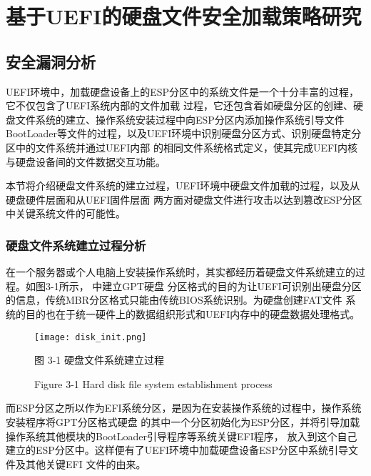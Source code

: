 %
%
\chapter{基于UEFI的硬盘文件安全加载策略研究}
\label{cha:architecture}

%
%
\section{安全漏洞分析}
UEFI环境中，加载硬盘设备上的ESP分区中的系统文件是一个十分丰富的过程，它不仅包含了UEFI系统内部的文件加载
过程，它还包含着如硬盘分区的创建、硬盘文件系统的建立、操作系统安装过程中向ESP分区内添加操作系统引导文件
BootLoader等文件的过程，以及UEFI环境中识别硬盘分区方式、识别硬盘特定分区中的文件系统并通过UEFI内部
的相同文件系统格式定义，使其完成UEFI内核与硬盘设备间的文件数据交互功能\cite{chinese19}。
\par 本节将介绍硬盘文件系统的建立过程，UEFI环境中硬盘文件加载的过程，以及从硬盘硬件层面和从UEFI固件层面
两方面对硬盘文件进行攻击以达到篡改ESP分区中关键系统文件的可能性。
\subsection{硬盘文件系统建立过程分析}
在一个服务器或个人电脑上安装操作系统时，其实都经历着硬盘文件系统建立的过程\cite{chinese22}。如图3-1所示，
中建立GPT硬盘
分区格式的目的为让UEFI可识别出硬盘分区的信息，传统MBR分区格式只能由传统BIOS系统识别。为硬盘创建FAT文件
系统的目的也在于统一硬件上的数据组织形式和UEFI内存中的硬盘数据处理格式\cite{extra1}。

\begin{figure}[htb]
    \label{ffs_format}
    \vspace{0cm}   
    \setlength{\abovecaptionskip}{0.3cm}  
	\centering
    \texttt{[image: disk\_init.png]}
    \caption*{图 3-1 硬盘文件系统建立过程}
    \setlength{\belowcaptionskip}{-0.7cm}
    \caption*{Figure 3-1 Hard disk file system establishment process}
\end{figure}

而ESP分区之所以作为EFI系统分区，是因为在安装操作系统的过程中，操作系统安装程序将GPT分区格式硬盘
的其中一个分区初始化为ESP分区，并将引导加载操作系统其他模块的BootLoader引导程序等系统关键EFI程序，
放入到这个自己建立的ESP分区中。这样便有了UEFI环境中加载硬盘设备ESP分区中系统引导文件及其他关键EFI
文件的由来。

